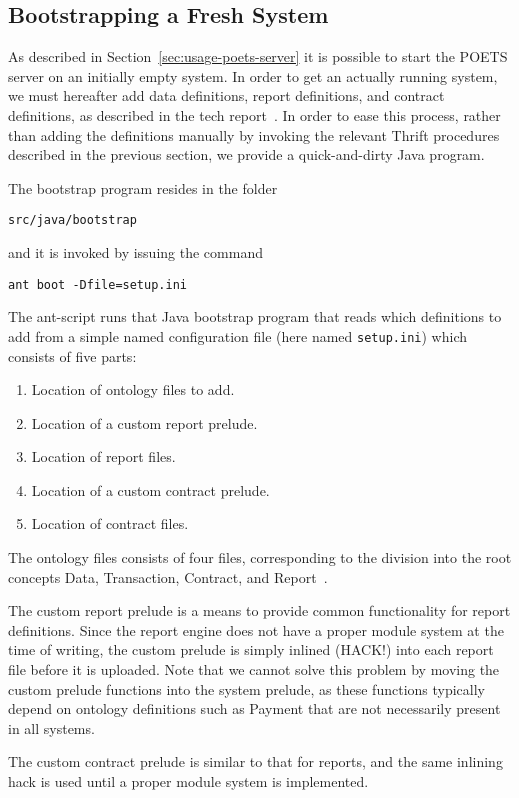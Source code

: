 \documentclass[10pt,final]{article}
\begin{document}
\subsection{Bootstrapping a Fresh System}
As described in Section~\ref{sec:usage-poets-server} it is possible to start the
POETS server on an initially empty system. In order to get an actually
running system, we must hereafter add data definitions, report
definitions, and contract definitions, as described in the tech
report~\cite[Section~3.4]{hvitved11tr}. In order to ease this process,
rather than adding the definitions manually by invoking the relevant
Thrift procedures described in the previous section, we provide a
quick-and-dirty Java program.

The bootstrap program resides in the folder
\begin{verbatim}
src/java/bootstrap
\end{verbatim}
and it is invoked by issuing the command
\begin{verbatim}
ant boot -Dfile=setup.ini
\end{verbatim}
The ant-script runs that Java bootstrap program that reads which
definitions to add from a simple named configuration file (here named
\verb-setup.ini-) which consists of five parts:
\begin{enumerate}
\item Location of ontology files to add.
\item Location of a custom report prelude.
\item Location of report files.
\item Location of a custom contract prelude.
\item Location of contract files.
\end{enumerate}

The ontology files consists of four files, corresponding to the
division into the root concepts Data, Transaction, Contract, and
Report~\cite{hvitved11tr}.

The custom report prelude is a means to provide common functionality
for report definitions. Since the report engine does not have a proper
module system at the time of writing, the custom prelude is simply
inlined (HACK!) into each report file before it is uploaded. Note that
we cannot solve this problem by moving the custom prelude functions
into the system prelude, as these functions typically depend on
ontology definitions such as Payment that are not necessarily present
in all systems.

The custom contract prelude is similar to that for reports, and the
same inlining hack is used until a proper module system is
implemented.



\end{document}
